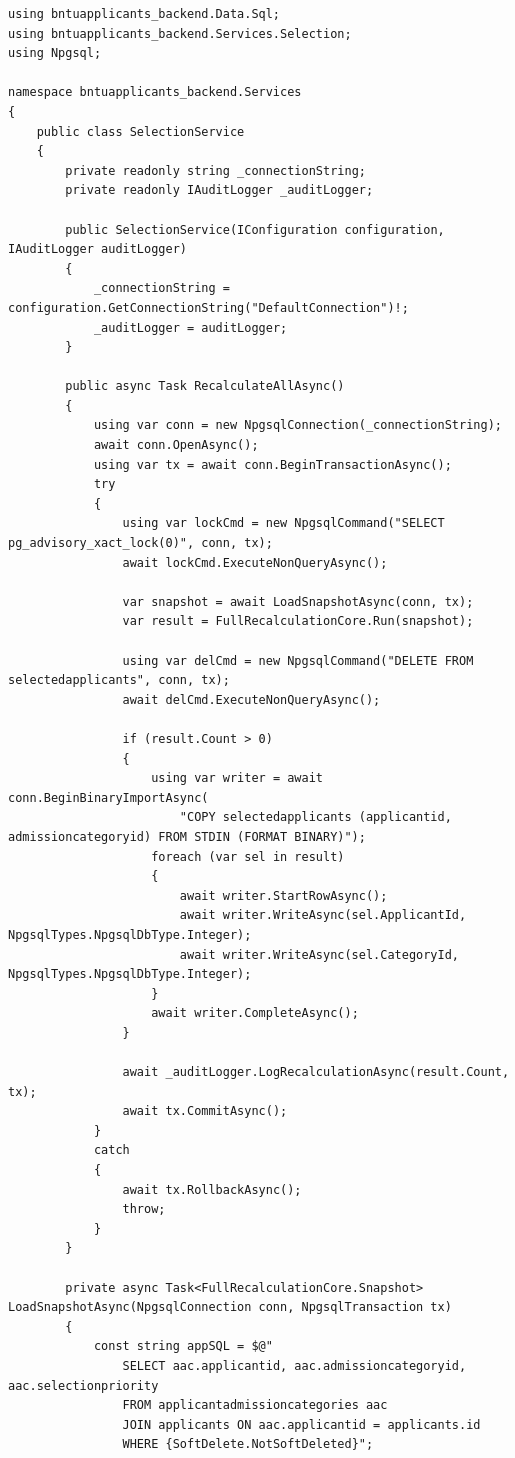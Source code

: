 \begin{lstlisting}[style=csharpstyle]
using bntuapplicants_backend.Data.Sql;
using bntuapplicants_backend.Services.Selection;
using Npgsql;

namespace bntuapplicants_backend.Services
{
    public class SelectionService
    {
        private readonly string _connectionString;
        private readonly IAuditLogger _auditLogger;

        public SelectionService(IConfiguration configuration, IAuditLogger auditLogger)
        {
            _connectionString = configuration.GetConnectionString("DefaultConnection")!;
            _auditLogger = auditLogger;
        }

        public async Task RecalculateAllAsync()
        {
            using var conn = new NpgsqlConnection(_connectionString);
            await conn.OpenAsync();
            using var tx = await conn.BeginTransactionAsync();
            try
            {
                using var lockCmd = new NpgsqlCommand("SELECT pg_advisory_xact_lock(0)", conn, tx);
                await lockCmd.ExecuteNonQueryAsync();

                var snapshot = await LoadSnapshotAsync(conn, tx);
                var result = FullRecalculationCore.Run(snapshot);

                using var delCmd = new NpgsqlCommand("DELETE FROM selectedapplicants", conn, tx);
                await delCmd.ExecuteNonQueryAsync();

                if (result.Count > 0)
                {
                    using var writer = await conn.BeginBinaryImportAsync(
                        "COPY selectedapplicants (applicantid, admissioncategoryid) FROM STDIN (FORMAT BINARY)");
                    foreach (var sel in result)
                    {
                        await writer.StartRowAsync();
                        await writer.WriteAsync(sel.ApplicantId, NpgsqlTypes.NpgsqlDbType.Integer);
                        await writer.WriteAsync(sel.CategoryId, NpgsqlTypes.NpgsqlDbType.Integer);
                    }
                    await writer.CompleteAsync();
                }

                await _auditLogger.LogRecalculationAsync(result.Count, tx);
                await tx.CommitAsync();
            }
            catch
            {
                await tx.RollbackAsync();
                throw;
            }
        }

        private async Task<FullRecalculationCore.Snapshot> LoadSnapshotAsync(NpgsqlConnection conn, NpgsqlTransaction tx)
        {
            const string appSQL = $@"
                SELECT aac.applicantid, aac.admissioncategoryid, aac.selectionpriority
                FROM applicantadmissioncategories aac
                JOIN applicants ON aac.applicantid = applicants.id
                WHERE {SoftDelete.NotSoftDeleted}";


\end{lstlisting}

